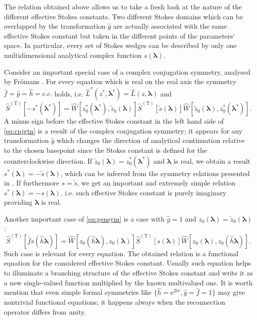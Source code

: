 \documentclass[atmp]{ipart_v1}
\def\LL{\widehat{L}}
\def\rme{\mathrm{e}}
\def\rmi{\mathrm{i}}
\def\lmbd{\bm{\lambda}}
\def\f{\hat{f}}
\def\g{\hat{g}}
\def\h{\hat{h}}
\def\S{\widehat{S}}
\def\W{\widehat{W}}
\def\T{\mathrm{T}}
\def\unity{1}
\newcommand\eref[1]{\eqref{#1}}
\begin{document}
The relation obtained above allows us to take a fresh look at the nature of the 
different effective Stokes constants. Two different Stokes domains which can be overlapped by the 
transformation $\g$ are actually associated with the same effective Stokes constant but 
taken in the different points of the parameters` space. In particular, every set of Stokes 
wedges can be described by only one multidimensional analytical complex function $s(\lmbd)$.

Consider an important special case of a complex conjugation symmetry, 
analysed by Fr\"omans \cite{frsymm}. 
For every equation which is real on the real axis the symmetry $\f=\g=\h=c.c.$ holds, 
i.e. $\LL^*(z^*,\lmbd^*)=\LL(z,\lmbd)$ and
\begin{equation}
\S^{(\T)} \left[ - s^*(\lmbd^*) \right] = 
\W \left[ z_0^*(\lmbd^*), \tilde{z}_0(\lmbd) \right]
\S^{(\T)} \left[ \tilde{s}(\lmbd) \right]
\W \left[ \tilde{z}_0(\lmbd), z_0^*(\lmbd^*) \right].
\label{eq:cnjgtn}
\end{equation}
A minus sign before the effective Stokes constant in the left hand side of \eref{eq:cnjgtn} is a result 
of the complex conjugation symmetry; it appears for any transformation $\g$ which changes the direction
of analytical continuation relative to the chosen basepoint since the Stokes constant is defined for the 
counterclockwise direction.
If $\tilde{z}_0(\lmbd) = z_0^*(\lmbd^*)$ and $\lmbd$ is real, we obtain a result 
$s^*(\lmbd) = - \tilde{s}(\lmbd)$, which can be inferred from the symmetry relations presented in \cite{frsymm}. 
If furthermore $s = \tilde{s}$, we get an important and extremely simple relation $ s^*(\lmbd) = - s(\lmbd)$, 
i.e. such effective Stokes constant is purely imaginary providing $\lmbd$ is real.

Another important case of \eref{eq:gensym} is a case with $\g=\unity$ and $z_0(\lmbd) = \tilde{z}_0(\lmbd)$:
\begin{equation}
\S^{(\T)} \left[ \f s(\h\lmbd) \right] = 
\W \left[ z_0(\h\lmbd), z_0(\lmbd) \right]
\S^{(\T)} \left[ s(\lmbd) \right]
\W \left[ z_0(\lmbd), z_0(\h\lmbd) \right].
\label{eq:func}
\end{equation}
Such case is relevant for every equation. The obtained relation is a functional 
equation for the considered effective Stokes constant. Usually such equation helps to illuminate 
a branching structure of the effective Stokes constant and write it as a new single-valued function 
multiplied by the known multivalued one. It is worth mention that even simple formal 
symmetries like $\{\h=\rme^{2\rmi\pi},\g=\f=\unity\}$ may give nontrivial functional equations; 
it happens always when the reconnection operator differs from unity.
\end{document}
